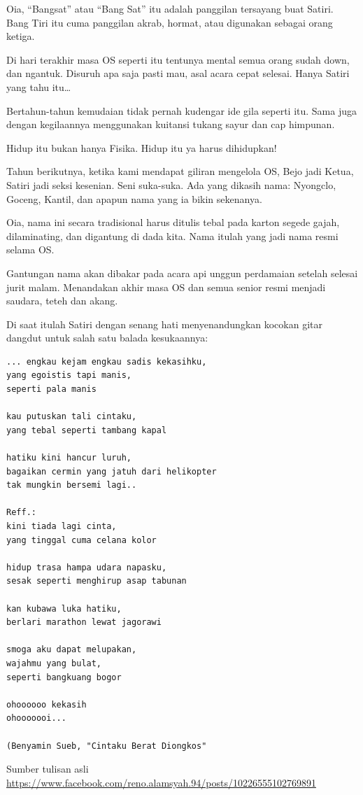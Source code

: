 Oia, “Bangsat” atau “Bang Sat” itu adalah panggilan tersayang buat Satiri. Bang Tiri itu cuma panggilan akrab, hormat, atau digunakan sebagai orang ketiga.

Di hari terakhir masa OS seperti itu tentunya mental semua orang sudah down, dan ngantuk. Disuruh apa saja pasti mau, asal acara cepat selesai. Hanya Satiri yang tahu itu…

Bertahun-tahun kemudaian tidak pernah kudengar ide gila seperti itu. Sama juga dengan kegilaannya menggunakan kuitansi tukang sayur dan cap himpunan.

Hidup itu bukan hanya Fisika. Hidup itu ya harus dihidupkan!

Tahun berikutnya, ketika kami mendapat giliran mengelola OS, Bejo jadi Ketua, Satiri jadi seksi kesenian. Seni suka-suka. Ada yang dikasih nama: Nyongclo, Goceng, Kantil, dan apapun nama yang ia bikin sekenanya.

Oia, nama ini secara tradisional harus ditulis tebal pada karton segede gajah, dilaminating, dan digantung di dada kita. Nama itulah yang jadi nama resmi selama OS.

Gantungan nama akan dibakar pada acara api unggun perdamaian setelah selesai jurit malam. Menandakan akhir masa OS dan semua senior resmi menjadi saudara, teteh dan akang.

Di saat itulah Satiri dengan senang hati menyenandungkan kocokan gitar dangdut untuk salah satu balada kesukaannya:

\begin{verbatim}
... engkau kejam engkau sadis kekasihku,
yang egoistis tapi manis,
seperti pala manis

kau putuskan tali cintaku,
yang tebal seperti tambang kapal

hatiku kini hancur luruh,
bagaikan cermin yang jatuh dari helikopter
tak mungkin bersemi lagi..

Reff.:
kini tiada lagi cinta,
yang tinggal cuma celana kolor

hidup trasa hampa udara napasku,
sesak seperti menghirup asap tabunan

kan kubawa luka hatiku,
berlari marathon lewat jagorawi

smoga aku dapat melupakan,
wajahmu yang bulat,
seperti bangkuang bogor

ohoooooo kekasih
ohooooooi...

(Benyamin Sueb, "Cintaku Berat Diongkos"
\end{verbatim}

\vspace{10mm}

Sumber tulisan asli \url{https://www.facebook.com/reno.alamsyah.94/posts/10226555102769891}

